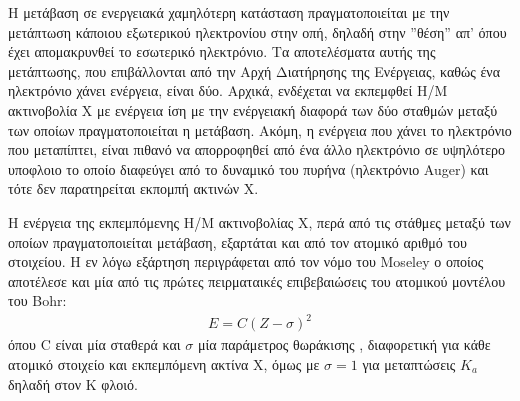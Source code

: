 \documentclass[a4paper]{article}
\begin{document}
	
	
	Η μετάβαση σε ενεργειακά χαμηλότερη κατάσταση πραγματοποιείται με την μετάπτωση κάποιου εξωτερικού ηλεκτρονίου στην οπή, δηλαδή στην ''θέση'' απ' όπου έχει απομακρυνθεί το εσωτερικό ηλεκτρόνιο. Τα αποτελέσματα αυτής της μετάπτωσης, που επιβάλλονται από την Αρχή Διατήρησης της Ενέργειας, καθώς ένα ηλεκτρόνιο χάνει ενέργεια, είναι δύο. Αρχικά, ενδέχεται να εκπεμφθεί Η/Μ ακτινοβολία Χ με ενέργεια ίση με την ενέργειακή διαφορά των δύο σταθμών μεταξύ των οποίων πραγματοποιείται η μετάβαση. Ακόμη, η ενέργεια που χάνει το ηλεκτρόνιο που μεταπίπτει, είναι πιθανό να απορροφηθεί από ένα άλλο ηλεκτρόνιο σε υψηλότερο υποφλοιο το οποίο διαφεύγει από το δυναμικό του πυρήνα (ηλεκτρόνιο Auger) και τότε δεν παρατηρείται εκπομπή ακτινών Χ.
	
	
	Η ενέργεια της εκπεμπόμενης Η/Μ ακτινοβολίας Χ, περά από τις στάθμες μεταξύ των οποίων πραγματοποιείται μετάβαση, εξαρτάται και από τον ατομικό αριθμό του στοιχείου. Η εν λόγω εξάρτηση περιγράφεται από τον νόμο του Moseley ο οποίος αποτέλεσε και μία από τις πρώτες πειρματαικές επιβεβαιώσεις του ατομικού μοντέλου του Bohr:
	\begin{align}\label{1}		
		E = C ( Z - \sigma)^2		
	\end{align}
	όπου C είναι μία σταθερά και $\sigma$ μία παράμετρος θωράκισης , διαφορετική για κάθε ατομικό στοιχείο και εκπεμπόμενη ακτίνα Χ, όμως με $\sigma=1$ για μεταπτώσεις $K_a$ δηλαδή στον Κ φλοιό.
	
\end{document}
